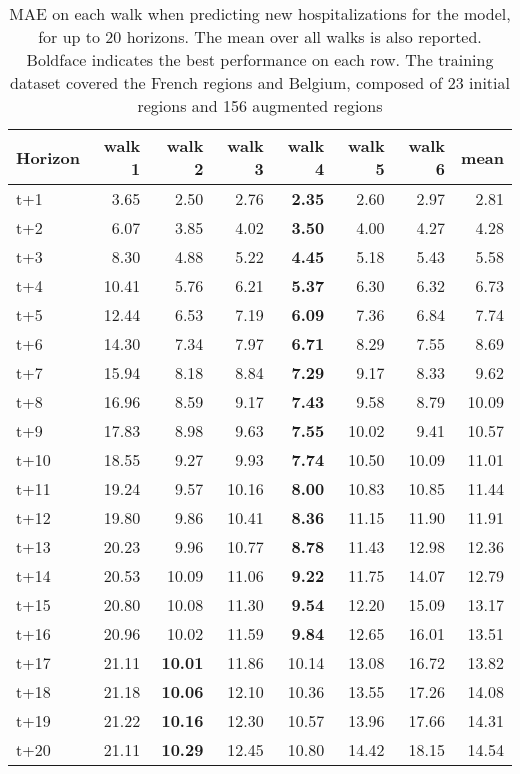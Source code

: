 \begin{table}[H]
\centering
\caption{MAE on each walk when predicting new hospitalizations for the model, for up to 20 horizons. The mean over all walks is also reported. Boldface indicates the best performance on each row. The training dataset covered the French regions and Belgium, composed of 23 initial regions and 156 augmented regions }
\label{tab:MAE_walk_baseline}
\begin{tabular}{lrrrrrrr}
\toprule
Horizon &  walk 1 &  walk 2 &  walk 3 &  walk 4 &  walk 5 &  walk 6 &  mean \\
\midrule
t+1  & 3.65  & 2.50  & 2.76  & \textbf{2.35}  & 2.60  & 2.97  & 2.81  \\
t+2  & 6.07  & 3.85  & 4.02  & \textbf{3.50}  & 4.00  & 4.27  & 4.28  \\
t+3  & 8.30  & 4.88  & 5.22  & \textbf{4.45}  & 5.18  & 5.43  & 5.58  \\
t+4  & 10.41  & 5.76  & 6.21  & \textbf{5.37}  & 6.30  & 6.32  & 6.73  \\
t+5  & 12.44  & 6.53  & 7.19  & \textbf{6.09}  & 7.36  & 6.84  & 7.74  \\
t+6  & 14.30  & 7.34  & 7.97  & \textbf{6.71}  & 8.29  & 7.55  & 8.69  \\
t+7  & 15.94  & 8.18  & 8.84  & \textbf{7.29}  & 9.17  & 8.33  & 9.62  \\
t+8  & 16.96  & 8.59  & 9.17  & \textbf{7.43}  & 9.58  & 8.79  & 10.09  \\
t+9  & 17.83  & 8.98  & 9.63  & \textbf{7.55}  & 10.02  & 9.41  & 10.57  \\
t+10  & 18.55  & 9.27  & 9.93  & \textbf{7.74}  & 10.50  & 10.09  & 11.01  \\
t+11  & 19.24  & 9.57  & 10.16  & \textbf{8.00}  & 10.83  & 10.85  & 11.44  \\
t+12  & 19.80  & 9.86  & 10.41  & \textbf{8.36}  & 11.15  & 11.90  & 11.91  \\
t+13  & 20.23  & 9.96  & 10.77  & \textbf{8.78}  & 11.43  & 12.98  & 12.36  \\
t+14  & 20.53  & 10.09  & 11.06  & \textbf{9.22}  & 11.75  & 14.07  & 12.79  \\
t+15  & 20.80  & 10.08  & 11.30  & \textbf{9.54}  & 12.20  & 15.09  & 13.17  \\
t+16  & 20.96  & 10.02  & 11.59  & \textbf{9.84}  & 12.65  & 16.01  & 13.51  \\
t+17  & 21.11  & \textbf{10.01}  & 11.86  & 10.14  & 13.08  & 16.72  & 13.82  \\
t+18  & 21.18  & \textbf{10.06}  & 12.10  & 10.36  & 13.55  & 17.26  & 14.08  \\
t+19  & 21.22  & \textbf{10.16}  & 12.30  & 10.57  & 13.96  & 17.66  & 14.31  \\
t+20  & 21.11  & \textbf{10.29}  & 12.45  & 10.80  & 14.42  & 18.15  & 14.54  \\

\bottomrule
\end{tabular}
\end{table}

